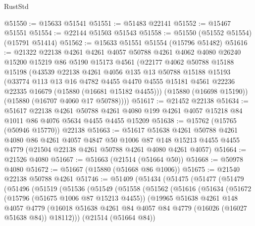\begin{lexlean}{RustStd}
\begin{coremodule}
@51550 := @15633 @51541
@51551 := @51483 @22141
@51552 := @15467 @51551
@51554 := @22144 @51503 @51543
@51558 := @51550 (@51552 @51554) (@15791 @51414)
@51562 := @15633 @51551 @51554 (@15796 @51482)
@51616 := @21322
    @22138
    @4261
    @4261
    @4057
    @50788
    @4261
    @4062
    @4080
    @26240
    @15200
    @15219
    @86
    @5190
    @15173
    @4561
    (@22177
      @4062
      @50788
      @15188
      @15198
      (@43539
        @22138
        @4261
        @4056
        @135
        @13
        @50788
        @15188
        @15193
        (@33774
          @113
          @13
          @16
          @4782
          @4455
          @4470
          @4555
          @15181
          @4561
          @22236
          @22335
          @16679
          (@15880 (@16681 @15182 @4455)))
        (@15880 (@16698 @15190))
        (@15880 (@16707 @4060 @17 @50788))))
@51617 := @21452 @22138
@51634 := @51617
    @22138
    @4261
    @50788
    @4261
    @4080
    @199
    @4261
    @4057
    @15218
    @84
    @1011
    @86
    @4076
    @5634
    @4455
    @4455
    @15209
@51638 := @15762 (@15765 (@50946 @15770)) @22138
@51663 := @51617
    @51638
    @4261
    @50788
    @4261
    @4080
    @86
    @4261
    @4057
    @4847
    @50
    @1006
    @87
    @148
    @15213
    @4455
    @4455
    @4779
    (@21504 @22138 @4261 @50788 @4261 @4080 @4261 @4057)
@51664 := @21526 @4080
@51667 := @51663 (@21514 (@51664 @50))
@51668 := @50978 @4080
@51672 := @51667 (@15880 (@51668 @86 @1006))
@51675 := @21540 @22138 @50788 @4261
@51746 := @51409
    (@51434
      (@51475
        (@51477
          (@51479
            (@51496
              (@51519
                (@51536
                  (@51549
                    (@51558
                      (@51562
                        (@51616
                          (@51634
                            (@51672
                              (@15796 (@51675 @1006 @87 @15213 @4455))
                              (@19965
                                @51638
                                @4261
                                @148
                                @4057
                                @4779
                                (@16018
                                  @51638
                                  @4261
                                  @84
                                  @4057
                                  @84
                                  @4779
                                  (@16026 (@16027 @51638 @84))
                                  @18112)))
                            (@21514 (@51664 @84))

\end{coremodule}
\end{lexlean}
